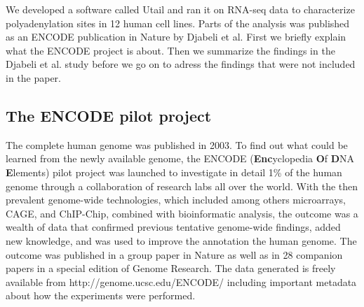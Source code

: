 %








We developed a software called Utail and ran it on RNA-seq data to characterize
polyadenylation sites in 12 human cell lines. Parts of the analysis was
published as an ENCODE publication in Nature by Djabeli et al. First we briefly
explain what the ENCODE project is about. Then we summarize the findings in the
Djabeli et al. study before we go on to adress the findings that were not
included in the paper.

\subsection{The ENCODE pilot project}
The complete human genome was published in 2003. To find out what could be
learned from the newly available genome, the ENCODE (\textbf{Enc}yclopedia
\textbf{O}f \textbf{D}NA \textbf{E}lements) pilot project was launched to
investigate in detail 1\% of the human genome through a collaboration of
research labs all over the world. With the then prevalent genome-wide
technologies, which included among others microarrays, CAGE, and ChIP-Chip,
combined with bioinformatic analysis, the outcome was a wealth of data that
confirmed previous tentative genome-wide findings, added new knowledge, and was
used to improve the annotation the human genome. The outcome was published in a
group paper in Nature \cite{birney_identification_2007} as well as in 28
companion papers in a special edition of Genome Research. The data generated is
freely available from http://genome.ucsc.edu/ENCODE/ including important
metadata about how the experiments were performed.

